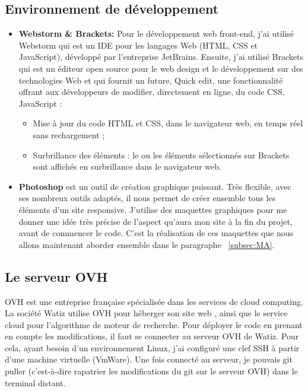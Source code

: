 \documentclass[a4paper, 12pt]{report}
\begin{document}
\subsection{Environnement de développement}
\begin{itemize}
\item \textbf{Webstorm \& Brackets:}
Pour le développement web front-end, j'ai utilisé Webstorm qui  est un IDE pour les langages Web (HTML, CSS et JavaScript), développé par l'entreprise JetBrains. 
Ensuite, j’ai utilisé Brackets qui est un éditeur open source pour le web design et le développement sur des technologies Web et qui fournit un future, Quick edit, une fonctionnalité offrant aux développeurs de modifier, directement en ligne, du code CSS, JavaScript :
\begin{itemize}
\item Mise à jour du code HTML et CSS, dans le navigateur web, en temps réel sans rechargement ;
\item  Surbrillance des éléments : le ou les éléments sélectionnés sur Brackets sont affichés en surbrillance dans le navigateur web.
\end{itemize} 

\item \textbf{Photoshop} 
est un outil de création graphique puissant. Très flexible, avec ses nombreux outils adaptés, il nous permet de créer ensemble tous les éléments d’un site responsive.
J'utilise des maquettes graphiques pour me donner une idée très précise de l'aspect qu'aura mon site à la fin du projet, avant de commencer le code.
C'est la réalisation de ces maquettes que nous allons maintenant aborder ensemble dans le paragraphe ~\ref{subsec:MA}.
\end{itemize} 
\subsection{Le serveur OVH}
OVH est une entreprise française spécialisée dans les services de cloud computing.
La société Watiz utilise OVH pour héberger son site web , ainsi que le service cloud pour l’algorithme de  moteur de recherche.
Pour déployer le code en prenant en compte les modifications, il faut se connecter au serveur OVH de Watiz. Pour cela, ayant besoin d’un environnement Linux,  j’ai configuré une clef SSH à partir d’une machine virtuelle (VmWare).
Une fois connecté au serveur, je pouvais git puller (c’est-à-dire rapatrier les modifications du git sur le serveur OVH) dans le terminal distant.
\end{document}
